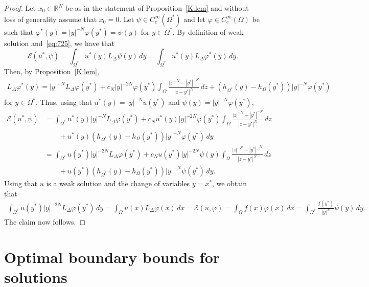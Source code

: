 \documentclass[11pt]{article}
\numberwithin{equation}{section}
\newcommand{\cE}{{\mathcal E}}
\begin{document}
\begin{proof}
Let $x_0\in\mathbb R^N$ be as in the statement of Proposition~\ref{K:lem} and without loss of generality assume that $x_0=0$. Let $\psi\in C_c^\infty(\Omega^*)$ and let $\varphi\in C^\infty_c(\Omega)$ be such that $\varphi^*(y)=|y|^{-N}\varphi(y^*)=\psi(y)$ for $y\in \Omega^*$. By definition of weak solution and~\eqref{eq:725}, we have that
    \begin{equation}
\mathcal E(u^*,\psi)=\int_{\Omega^*}u^*(y)L_{\Delta}\psi(y) \, dy
=\int_{\Omega^*}u^*(y)L_{\Delta}\varphi^*(y) \, dy. 
    \end{equation}
Then, by Proposition~\ref{K:lem},
\begin{align*}
L_\Delta \varphi^*(y)
= |y|^{-N} L_\Delta \varphi(y^*) + c_N |y|^{-2N} \varphi(y^*) \int_{\Omega}\frac{|z|^{-N}-|y^*|^{-N}}{|z-y^*|^N}\, dz  + (h_{\Omega^*}(y)-h_\Omega(y^*))|y|^{-N}\varphi(y^*)
\end{align*}
for $y\in \Omega^*$.  Thus, using that $u^*(y) = |y|^{-N} u(y^*)$ and $\psi(y)=|y|^{-N}\varphi(y^*)$,
\begin{align*}
\mathcal E(u^*,\psi)
&=\int_{\Omega^*}
u^*(y)|y|^{-N} L_\Delta \varphi(y^*) 
+ c_N u^*(y) |y|^{-2N} \varphi(y^*) \int_{\Omega}\frac{|z|^{-N}-|y^*|^{-N}}{|z-y^*|^N}\, dz \\
&\qquad + u^*(y)(h_{\Omega^*}(y)-h_\Omega(y^*))|y|^{-N}\varphi(y^*)
\, dy\\
&=\int_{\Omega^*}
u(y^*)|y|^{-2N} L_\Delta \varphi(y^*) 
+ c_N u(y^*) |y|^{-2N} \psi(y) \int_{\Omega}\frac{|z|^{-N}-|y^*|^{-N}}{|z-y^*|^N}\, dz \\
&\qquad + u(y^*)(h_{\Omega^*}(y)-h_\Omega(y^*))|y|^{-N}\psi(y^*)
\, dy.
\end{align*}
Using that $u$ is a weak solution and the change of variables $y=x^*$, we obtain that
\begin{align*}
\int_{\Omega^*}
u(y^*)|y|^{-2N} L_\Delta \varphi(y^*)\, dy
=\int_{\Omega}u(x)L_\Delta \varphi(x)\, dx=\cE(u,\varphi)=\int_\Omega f(x) \varphi(x)\, dx
=\int_{\Omega^*}
\frac{f(y^*)}{|y|^{N}}\psi(y) \, dy
.
\end{align*}
The claim now follows. 
\end{proof}



\section{Optimal boundary bounds for solutions}\label{ob:sec}
\end{document}
